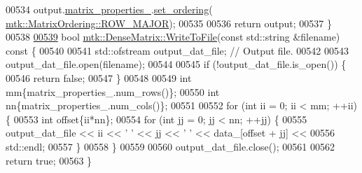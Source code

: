 \begin{DoxyCode}
00534   output.\hyperlink{classmtk_1_1DenseMatrix_a481c8d09af685a5ba67acefdcaa810cc}{matrix\_properties\_}.\hyperlink{classmtk_1_1Matrix_a8bdaf3f8307b00a36843359f165e1f17}{set\_ordering}(
      \hyperlink{namespacemtk_ga622801bd9f912d0f976c3e383f5f581ca21541962976d7709c26e9cd8385bd648}{mtk::MatrixOrdering::ROW\_MAJOR});
00535 
00536   \textcolor{keywordflow}{return} output;
00537 \}
00538 
\hypertarget{mtk__dense__matrix_8cc_source_l00539}{}\hyperlink{classmtk_1_1DenseMatrix_ab396804fb5f188e1eaa8578c738c59fc}{00539} \textcolor{keywordtype}{bool} \hyperlink{classmtk_1_1DenseMatrix_ab396804fb5f188e1eaa8578c738c59fc}{mtk::DenseMatrix::WriteToFile}(\textcolor{keyword}{const} std::string &filename)\textcolor{keyword}{ const }\{
00540 
00541   std::ofstream output\_dat\_file;  \textcolor{comment}{// Output file.}
00542 
00543   output\_dat\_file.open(filename);
00544 
00545   \textcolor{keywordflow}{if} (!output\_dat\_file.is\_open()) \{
00546     \textcolor{keywordflow}{return} \textcolor{keyword}{false};
00547   \}
00548 
00549   \textcolor{keywordtype}{int} mm\{matrix\_properties\_.num\_rows()\};
00550   \textcolor{keywordtype}{int} nn\{matrix\_properties\_.num\_cols()\};
00551 
00552   \textcolor{keywordflow}{for} (\textcolor{keywordtype}{int} ii = 0; ii < mm; ++ii) \{
00553     \textcolor{keywordtype}{int} offset\{ii*nn\};
00554     \textcolor{keywordflow}{for} (\textcolor{keywordtype}{int} jj = 0; jj < nn; ++jj) \{
00555       output\_dat\_file << ii << \textcolor{charliteral}{' '} << jj << \textcolor{charliteral}{' '} << data\_[offset + jj] <<
00556         std::endl;
00557     \}
00558   \}
00559 
00560   output\_dat\_file.close();
00561 
00562   \textcolor{keywordflow}{return} \textcolor{keyword}{true};
00563 \}
\end{DoxyCode}
